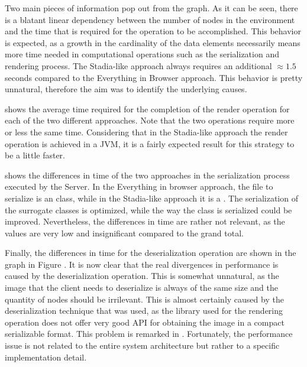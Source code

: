 Two main pieces of information pop out from the graph. As it can be seen, there is a blatant linear dependency between the number of nodes in the environment and the time that is required for the operation to be accomplished. This behavior is expected, as a growth in the cardinality of the data elements necessarily means more time needed in computational operations such as the serialization and rendering process.
The Stadia-like approach always requires an additional $\approx 1.5$ seconds compared to the Everything in Browser approach. This behavior is pretty unnatural, therefore the aim was to identify the underlying causes.\newline

 shows the average time required for the completion of the render operation for each of the two different approaches. Note that the two operations require more or less the same time. Considering that in the Stadia-like approach the render operation is achieved in a JVM, it is a fairly expected result for this strategy to be a little faster.\newline


 shows the differences in time of the two approaches in the serialization process executed by the Server. In the Everything in browser approach, the file to serialize is an  class, while in the Stadia-like approach it is a . The serialization of the surrogate classes is optimized, while the way the  class is serialized could be improved. Nevertheless, the differences in time are rather not relevant, as the values are very low and insignificant compared to the grand total.\newline

Finally, the differences in time for the deserialization operation are shown in the graph in Figure . It is now clear that the real divergences in performance is caused by the deserialization operation. This is somewhat unnatural, as the image that the client needs to deserialize is always of the same size and the quantity of nodes should be irrilevant. This is almost certainly caused by the deserialization technique that was used, as the library used for the rendering operation does not offer very good API for obtaining the image in a compact serializable format. This problem is remarked in . Fortunately, the performance issue is not related to the entire system architecture but rather to a specific implementation detail.\newline

